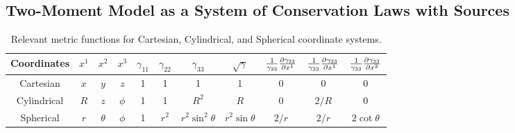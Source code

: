 \documentclass[10pt,preprint]{aastex}
\begin{document}
\subsection{Two-Moment Model as a System of Conservation Laws with Sources}

\begin{table}
  \begin{center}
  \caption{Relevant metric functions for Cartesian, Cylindrical, and Spherical coordinate systems.\label{tab:metricFunctions}}
  \begin{tabular}{ccccccccccc}
    \midrule
    Coordinates & $x^{1}$ & $x^{2}$ & $x^{3}$ & $\gamma_{11}$ & $\gamma_{22}$ & $\gamma_{33}$ & $\sqrt{\gamma}$
    & $\frac{1}{\gamma_{22}}\frac{\partial \gamma_{22}}{\partial x^{1}}$ & $\frac{1}{\gamma_{33}}\frac{\partial \gamma_{33}}{\partial x^{1}}$ & $\frac{1}{\gamma_{33}}\frac{\partial \gamma_{33}}{\partial x^{2}}$ \\
    \midrule
    \midrule
    Cartesian & $x$ & $y$ & $z$ & 1 & 1 & 1 & 1 & 0 & 0 & 0 \\
    Cylindrical & $R$ & $z$ & $\phi$ & 1 & 1 & $R^{2}$ & $R$ & 0 & $2/R$ & 0 \\
    Spherical & $r$ & $\theta$ & $\phi$ & 1 & $r^{2}$ & $r^{2}\sin^{2}\theta$ & $r^{2}\sin\theta$ & $2/r$ & $2/r$ & $2\cot\theta$ \\
    \midrule
    \midrule
  \end{tabular}
  \end{center}
\end{table}
\end{document}
